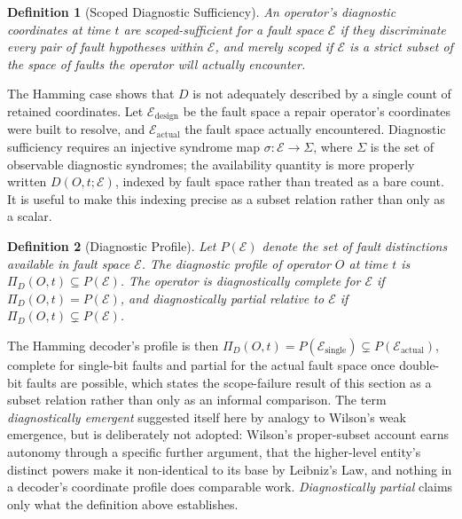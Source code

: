 \documentclass[11pt]{article}
\newtheorem{definition}{Definition}[section]
\begin{document}
\begin{definition}[Scoped Diagnostic Sufficiency]
An operator's diagnostic coordinates at time $t$ are scoped-sufficient for a fault space $\mathcal{E}$ if they discriminate every pair of fault hypotheses within $\mathcal{E}$, and merely scoped if $\mathcal{E}$ is a strict subset of the space of faults the operator will actually encounter.
\end{definition}

The Hamming case shows that $D$ is not adequately described by a single count of retained coordinates. Let $\mathcal{E}_{\text{design}}$ be the fault space a repair operator's coordinates were built to resolve, and $\mathcal{E}_{\text{actual}}$ the fault space actually encountered. Diagnostic sufficiency requires an injective syndrome map $\sigma : \mathcal{E} \to \Sigma$, where $\Sigma$ is the set of observable diagnostic syndromes; the availability quantity is more properly written $D(O,t;\mathcal{E})$, indexed by fault space rather than treated as a bare count. It is useful to make this indexing precise as a subset relation rather than only as a scalar.

\begin{definition}[Diagnostic Profile]
Let $P(\mathcal{E})$ denote the set of fault distinctions available in fault space $\mathcal{E}$. The diagnostic profile of operator $O$ at time $t$ is $\Pi_D(O,t) \subseteq P(\mathcal{E})$. The operator is diagnostically complete for $\mathcal{E}$ if $\Pi_D(O,t) = P(\mathcal{E})$, and diagnostically partial relative to $\mathcal{E}$ if $\Pi_D(O,t) \subsetneq P(\mathcal{E})$.
\end{definition}

The Hamming decoder's profile is then $\Pi_D(O,t) = P(\mathcal{E}_{\text{single}}) \subsetneq P(\mathcal{E}_{\text{actual}})$, complete for single-bit faults and partial for the actual fault space once double-bit faults are possible, which states the scope-failure result of this section as a subset relation rather than only as an informal comparison. The term \emph{diagnostically emergent} suggested itself here by analogy to Wilson's weak emergence, but is deliberately not adopted: Wilson's proper-subset account earns autonomy through a specific further argument, that the higher-level entity's distinct powers make it non-identical to its base by Leibniz's Law, and nothing in a decoder's coordinate profile does comparable work. \emph{Diagnostically partial} claims only what the definition above establishes.
\end{document}
